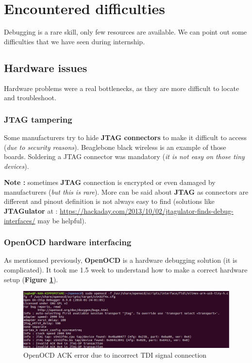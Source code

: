 \section{Encountered difficulties}
Debugging is a rare skill, only few resources are available. We can point out some difficulties that we have seen during internship.

\subsection{Hardware issues}
Hardware problems were a real bottlenecks, as they are more difficult to locate and troubleshoot.
\subsubsection{JTAG tampering}
Some manufacturers try to hide \textbf{JTAG connectors} to make it difficult to access (\textit{due to security reasons}). Beaglebone black wireless is an example of those boards. Soldering a JTAG connector was mandatory (\textit{it is not easy on those tiny devices}).

\textbf{\color{orange}Note : } sometimes \textbf{JTAG} connection is encrypted or even damaged by manufacturers (\textit{but this is rare}). 
More can be said about \textbf{JTAG} as connectors are different and pinout definition is not always easy to find (solutions like \textbf{JTAGulator} at : {\color{blue}\url{https://hackaday.com/2013/10/02/jtagulator-finds-debug-interfaces/}} may be helpful).
\subsubsection{OpenOCD hardware interfacing}
As mentionned previously, \textbf{OpenOCD} is a hardware debugging solution (it is complicated). It took me 1.5 week to understand how to make a correct hardware setup (\textbf{Figure \ref{OpenOCD ACK error due to incorrect TDI signal connection}}).


\begin{figure}[H]
		\centering
        \includegraphics[scale=0.40]{img/issues/tdi-not-connected-openocd.png}
        \caption{OpenOCD ACK error due to incorrect TDI signal connection}
        \label{OpenOCD ACK error due to incorrect TDI signal connection}
    \end{figure}


